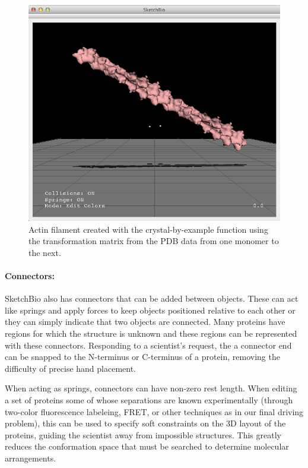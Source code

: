 \documentclass[twocolumn]{bmcart}%
\begin{document}
\begin{figure}[h]
\centering
\includegraphics[width=0.9\columnwidth]{crystal_actin.png}
\caption{Actin filament created with the crystal-by-example function using the transformation matrix from the PDB data from one monomer to the next.}
\label{fig:crystal_actin}
\end{figure}


\paragraph*{Connectors:}
SketchBio also has connectors that can be added between objects.
These can act like springs and apply forces to keep objects positioned relative to each other or they can simply indicate that two objects are connected.
Many proteins have regions for which the structure is unknown and these regions can be represented with these connectors.
Responding to a scientist's request, the a connector end can be snapped to the N-terminus or C-terminus of a protein, removing the difficulty of precise hand placement.

When acting as springs, connectors can have non-zero rest length.
When editing a set of proteins some of whose separations are known experimentally (through two-color fluorescence labeleing, FRET, or other techniques as in our final driving problem), this can be used to specify soft constraints on the 3D layout of the proteins, guiding the scientist away from impossible structures. This greatly reduces the conformation space that must be searched to determine molecular arrangements.
\end{document}
